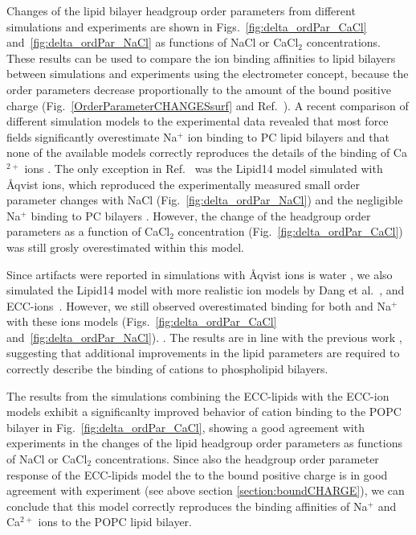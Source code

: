 \documentclass[aip,jcp,twocolumn]{revtex4}
\begin{document}
Changes of the lipid bilayer headgroup order parameters from different simulations and
experiments \cite{akutsu81,altenbach84} are shown in Figs.~\ref{fig:delta_ordPar_CaCl} and~\ref{fig:delta_ordPar_NaCl}
as functions of NaCl or CaCl$_2$ concentrations.
These results can be used to compare the ion binding affinities to lipid bilayers
between simulations and experiments using the electrometer concept, because 
the order parameters decrease proportionally 
to the amount of the bound positive charge (Fig.~\ref{OrderParameterCHANGESsurf} and Ref.~). 
A recent comparison of different simulation models to the experimental data
revealed that most force fields significantly overestimate Na$^+$ ion binding to PC
lipid bilayers and that none of the available models correctly reproduces
the details of the binding of Ca$^{2+}$ ions \cite{catte16}.
The only exception in Ref.~ was the Lipid14 model \cite{dickson14} simulated with \AA{}qvist ions,
which reproduced the experimentally measured 
small order parameter changes with NaCl (Fig.~\ref{fig:delta_ordPar_NaCl})
and the negligible Na$^+$ binding to PC bilayers \cite{akutsu81,altenbach84}.
However, the change of the headgroup order parameters as a function of CaCl$_2$ concentration 
(Fig.~\ref{fig:delta_ordPar_CaCl}) was still grosly overestimated within this model.

Since artifacts were reported in simulations with \AA{}qvist ions is water \cite{auffinger07},
we also simulated the Lipid14 model with more realistic ion models by Dang et al.~\cite{smith94,chang1999,dang2006}, and
ECC-ions~\cite{jungwirth17-new-paper-to-be-published, Pluharova2014}. 
However, we still observed overestimated binding for both  and Na$^+$ with these ions models 
(Figs.~\ref{fig:delta_ordPar_CaCl} and~\ref{fig:delta_ordPar_NaCl}). 
.
The results are in line with the previous work \cite{catte16},
suggesting that additional improvements in the lipid parameters are
required to correctly describe the binding of cations to phospholipid bilayers.

The results from the simulations combining the ECC-lipids with the ECC-ion models \cite{jungwirth17-new-paper-to-be-published, kohagen16, Pluharova2014}
exhibit a significanlty improved behavior of cation binding to the POPC bilayer in Fig.~\ref{fig:delta_ordPar_CaCl},
showing a good agreement with experiments in the changes of 
the lipid headgroup order parameters as functions of NaCl or CaCl$_2$ concentrations.
Since also the headgroup order parameter
response of the ECC-lipids model the to the bound positive charge 
is in good agreement with experiment (see above section \ref{section:boundCHARGE}),
we can conclude that this model correctly reproduces the binding affinities of
Na$^{+}$ and Ca$^{2+}$ ions to the POPC lipid bilayer.
\end{document}
